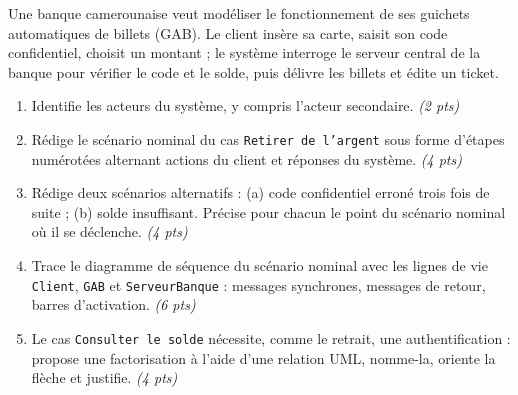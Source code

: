 \documentclass[11pt]{article}
\begin{document}
\begin{exercice}
Une banque camerounaise veut modéliser le fonctionnement de ses guichets automatiques de billets (GAB). Le client insère sa carte, saisit son code confidentiel, choisit un montant ; le système interroge le serveur central de la banque pour vérifier le code et le solde, puis délivre les billets et édite un ticket.
\begin{enumerate}
\item Identifie les acteurs du système, y compris l'acteur secondaire. \emph{(2 pts)}
\item Rédige le scénario nominal du cas \texttt{Retirer de l'argent} sous forme d'étapes numérotées alternant actions du client et réponses du système. \emph{(4 pts)}
\item Rédige deux scénarios alternatifs : (a) code confidentiel erroné trois fois de suite ; (b) solde insuffisant. Précise pour chacun le point du scénario nominal où il se déclenche. \emph{(4 pts)}
\item Trace le diagramme de séquence du scénario nominal avec les lignes de vie \texttt{Client}, \texttt{GAB} et \texttt{ServeurBanque} : messages synchrones, messages de retour, barres d'activation. \emph{(6 pts)}
\item Le cas \texttt{Consulter le solde} nécessite, comme le retrait, une authentification : propose une factorisation à l'aide d'une relation UML, nomme-la, oriente la flèche et justifie. \emph{(4 pts)}
\end{enumerate}
\end{exercice}
\end{document}
